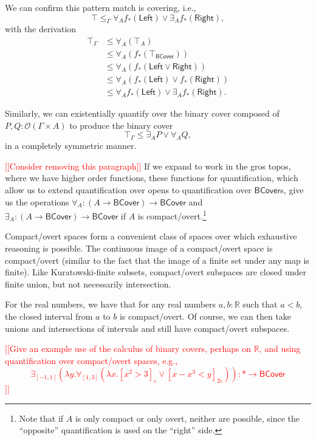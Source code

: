 \documentclass[conference]{IEEEtran}
\newcommand{\R}{\mathbb{R}}
\newcommand{\One}{\ast}
\newcommand{\Open}[1]{\mathcal{O}({#1})}
\newcommand{\note}[1]{\textcolor{red}{[[{#1}]]}}
\begin{document}
We can confirm this pattern match is covering, i.e.,
\[
\top \le_\Gamma \forall_A f_*(\mathsf{Left}) \vee \exists_A f_*(\mathsf{Right}),
\]
with the derivation
\begin{align*}
\top_\Gamma 
  &\le \forall_A (\top_A) \tag{$\forall_A$ adjointness}
\\ &\le \forall_A (f_*(\top_\mathsf{BCover})) \tag{$f_*$ preserves $\top$}
\\ &\le \forall_A (f_*(\mathsf{Left} \vee \mathsf{Right}))
\\ &\le \forall_A(f_*(\mathsf{Left}) \vee f_*(\mathsf{Right}))  \tag{$f_*$ preserves joins}
\\ &\le \forall_A f_*(\mathsf{Left}) \vee \exists_A f_*(\mathsf{Right}) \tag{$A$ is compact/overt}.
\end{align*}

Similarly, we can existentially quantify over the binary cover composed of $P, Q : \Open{\Gamma \times A}$ to produce the binary cover
\[
\top_\Gamma \le \exists_A P \vee \forall_A Q,
\]
in a completely symmetric manner.

\note{Consider removing this paragraph} If we expand to work in the gros topos, where we have higher order functions, these functions for quantification, which allow us to extend quantification over opens to quantification over $\mathsf{BCover}$s, give us the operations $\forall_A : (A \to \mathsf{BCover}) \to \mathsf{BCover}$ and $\exists_A : (A \to \mathsf{BCover}) \to \mathsf{BCover}$ if $A$ is compact/overt.\footnote{Note that if $A$ is only compact or only overt, neither are possible, since the ``opposite'' quantification is used on the ``right'' side.}

Compact/overt spaces form a convenient class of spaces over which exhaustive reasoning is possible. The continuous image of a compact/overt space is compact/overt (similar to the fact that the image of a finite set under any map is finite). Like Kuratowski-finite subsets, compact/overt subspaces are closed under finite union, but not necessarily intersection.

For the real numbers, we have that for any real numbers $a, b : \R$ such that $a < b$, the closed interval from $a$ to $b$ is compact/overt. Of course, we can then take unions and intersections of intervals and still have compact/overt subspaces.

\note{Give an example use of the calculus of binary covers, perhaps on $\R$, and using quantification over compact/overt spaces, e.g.,
\[
\exists_{[-1,1]}(\lambda y. \forall_{[1,3]} (\lambda x. [x^2 > 3]_\varepsilon \vee [x -x^3 < y]_{2\varepsilon})) : \One \to \mathsf{BCover}
\]}
\end{document}
